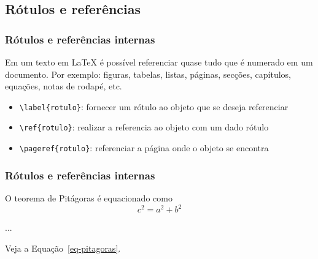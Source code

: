 \subsection{Rótulos e referências}

\begin{frame}[fragile]
\frametitle{Rótulos e referências internas}
Em um texto em \LaTeX{} é possível referenciar quase tudo que é numerado em um documento.
Por exemplo: figuras, tabelas, listas, páginas, secções, capítulos, equações, notas de rodapé, etc.
\pause

\vspace{3ex}
\begin{itemize}[<-+>]
\item \verb|\label{rotulo}|: fornecer um rótulo ao objeto que se deseja referenciar
\item \verb|\ref{rotulo}|: realizar a referencia ao objeto com um dado rótulo
\item \verb|\pageref{rotulo}|: referenciar a página onde o objeto se encontra
\end{itemize}

\end{frame}


\begin{frame}[fragile]
\frametitle{Rótulos e referências internas}
\begin{LTXexample}
O teorema de Pit\'agoras \'e equacionado como
\begin{equation}
\label{eq-pitagoras}
c^2 = a^2 + b^2
\end{equation}

...

Veja a Equa\c{c}\~ao~\ref{eq-pitagoras}.
\end{LTXexample}
\end{frame}

